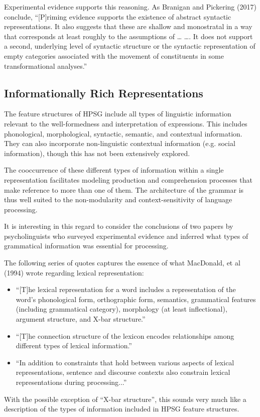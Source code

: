 \documentclass[a4paper]{article}
\begin{document}
Experimental evidence supports this reasoning.  As Branigan and Pickering (2017) conclude,
``[P]riming evidence supports the existence of abstract syntactic representations. It also suggests
that these are shallow and monostratal in a way that corresponds at least roughly to the assumptions
of \ldots{} \citet{ps2} \ldots{}. It does not support a second, underlying level of syntactic
structure or the syntactic representation of empty categories associated with the movement of
constituents in some transformational analyses.''

\subsection{Informationally Rich Representations}

The feature structures of HPSG include all
types of linguistic information relevant to the well-formedness and interpretation
of expressions. This includes phonological, morphological, syntactic, semantic, and contextual information.  They can also incorporate non-linguistic contextual information (e.g. social information), though this has not been extensively explored.

The cooccurrence of these different types of information within a single representation facilitates modeling production and comprehension processes that make reference to more than one of them.  The architecture of the grammar is thus well suited to the non-modularity and context-sensitivity of language processing.  

It is interesting in this regard to consider the conclusions of two papers by psycholinguists who surveyed experimental evidence and inferred what types of grammatical information was essential for processing.  

The following series of quotes captures the essence of what MacDonald, et al (1994) wrote regarding lexical representation:
\begin{itemize} 
\item ``[T]he lexical
representation for a word includes a representation of the
word's phonological form, orthographic form, semantics,
grammatical features (including grammatical category), morphology
(at least inflectional), argument structure, and X-bar
structure.''
\item ``[T]he connection
structure of the lexicon encodes relationships among
different types of lexical information.''
\item
``In addition to constraints that hold between various aspects
of lexical representations, sentence and discourse contexts also
constrain lexical representations during processing...''
\end{itemize}
With the possible exception of ``X-bar structure'', this sounds very much like a description of the types of information included in HPSG feature structures.
\end{document}
